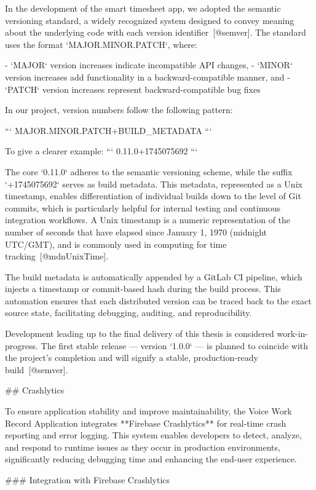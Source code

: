 \documentclass[
  digital,     %
  oneside,     %
  nosansbold,  %
  nocolorbold, %
  lof,         %
  lot,         %
]{fithesis4}
\begin{document}
\begin{markdown}
In the development of the smart timesheet app, we adopted the semantic versioning standard, a widely recognized system designed to convey meaning about the underlying code with each version identifier~[@semver]. The standard uses the format `MAJOR.MINOR.PATCH`, where:

- `MAJOR` version increases indicate incompatible API changes,
- `MINOR` version increases add functionality in a backward-compatible manner, and
- `PATCH` version increases represent backward-compatible bug fixes

In our project, version numbers follow the following pattern:

```
MAJOR.MINOR.PATCH+BUILD_METADATA
```

To give a clearer example:
```
0.11.0+1745075692
```

The core `0.11.0` adheres to the semantic versioning scheme, while the suffix `+1745075692` serves as build metadata. This metadata, represented as a Unix timestamp, enables differentiation of individual builds down to the level of Git commits, which is particularly helpful for internal testing and continuous integration workflows. A Unix timestamp is a numeric representation of the number of seconds that have elapsed since January 1, 1970 (midnight UTC/GMT), and is commonly used in computing for time tracking~[@mdnUnixTime].

The build metadata is automatically appended by a GitLab CI pipeline, which injects a timestamp or commit-based hash during the build process. This automation ensures that each distributed version can be traced back to the exact source state, facilitating debugging, auditing, and reproducibility.

Development leading up to the final delivery of this thesis is considered work-in-progress. The first stable release — version `1.0.0` — is planned to coincide with the project's completion and will signify a stable, production-ready build~[@semver].

## Crashlytics

To ensure application stability and improve maintainability, the Voice Work Record Application integrates **Firebase Crashlytics** for real-time crash reporting and error logging. This system enables developers to detect, analyze, and respond to runtime issues as they occur in production environments, significantly reducing debugging time and enhancing the end-user experience.

### Integration with Firebase Crashlytics


\end{markdown}
\end{document}
